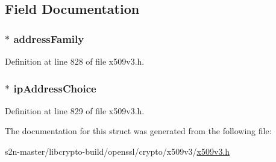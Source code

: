 \subsection{Field Documentation}
\subsubsection[{\texorpdfstring{address\+Family}{addressFamily}}]{ $\ast$ address\+Family}\hypertarget{struct_i_p_address_family__st_ae34a1e49f531df5650cb0b32e4a72d06}{}\label{struct_i_p_address_family__st_ae34a1e49f531df5650cb0b32e4a72d06}


Definition at line 828 of file x509v3.\+h.

\subsubsection[{\texorpdfstring{ip\+Address\+Choice}{ipAddressChoice}}]{ $\ast$ ip\+Address\+Choice}\hypertarget{struct_i_p_address_family__st_a3b73327c4ffea3e5b47b96435b076b16}{}\label{struct_i_p_address_family__st_a3b73327c4ffea3e5b47b96435b076b16}


Definition at line 829 of file x509v3.\+h.



The documentation for this struct was generated from the following file\+:\begin{DoxyCompactItemize}
\item 
s2n-\/master/libcrypto-\/build/openssl/crypto/x509v3/\hyperlink{crypto_2x509v3_2x509v3_8h}{x509v3.\+h}\end{DoxyCompactItemize}
